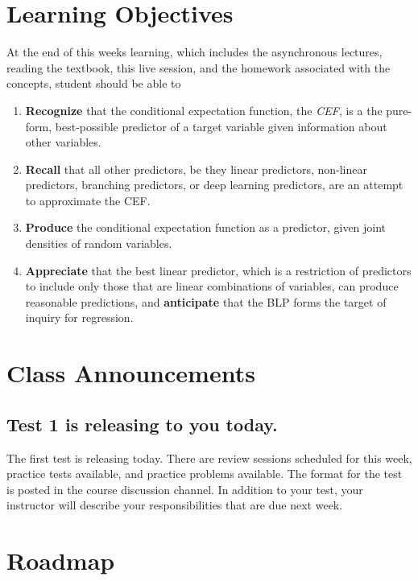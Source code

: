 \documentclass[
]{book}
\providecommand{\tightlist}{%
  \setlength{\itemsep}{0pt}\setlength{\parskip}{0pt}}
\theoremstyle{definition}
\theoremstyle{definition}
\theoremstyle{definition}
\theoremstyle{definition}
\theoremstyle{remark}
\begin{document}
\section{Learning Objectives}\label{learning-objectives-3}

At the end of this weeks learning, which includes the asynchronous lectures, reading the textbook, this live session, and the homework associated with the concepts, student should be able to

\begin{enumerate}
\def\labelenumi{\arabic{enumi}.}
\tightlist
\item
  \textbf{Recognize} that the conditional expectation function, the \emph{CEF}, is a the pure-form, best-possible predictor of a target variable given information about other variables.
\item
  \textbf{Recall} that all other predictors, be they linear predictors, non-linear predictors, branching predictors, or deep learning predictors, are an attempt to approximate the CEF.
\item
  \textbf{Produce} the conditional expectation function as a predictor, given joint densities of random variables.
\item
  \textbf{Appreciate} that the best linear predictor, which is a restriction of predictors to include only those that are linear combinations of variables, can produce reasonable predictions, and \textbf{anticipate} that the BLP forms the target of inquiry for regression.
\end{enumerate}

\section{Class Announcements}\label{class-announcements-2}

\subsection{Test 1 is releasing to you today.}\label{test-1-is-releasing-to-you-today.}

The first test is releasing today. There are review sessions scheduled for this week, practice tests available, and practice problems available. The format for the test is posted in the course discussion channel. In addition to your test, your instructor will describe your responsibilities that are due next week.

\section{Roadmap}\label{roadmap}
\end{document}
